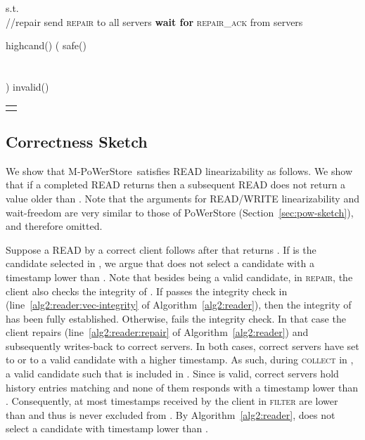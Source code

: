 \documentclass[10pt,conference,compsocconf]{IEEEtran}
\newcommand{\protocol}{PoWerStore}
\newcommand{\mprotocol}{M-PoWerStore}
\begin{document}
\begin{algo}[t]
\begin{distribalgo}[1]
\smallskip
{}
\STATE  s.t. \\ 
\IF {} \label{alg2:reader:vec-integrity}
\STATE  \label{alg2:reader:repair}\hfill //repair
\STATE send \textsc{repair} to all servers
\STATE \textbf{wait for} \textsc{repair\_ack} from  servers
\ENDIF
\ENDINDENT

\smallskip
{}
\STATE \textsf{highcand}()  (
\smallskip
\STATE \textsf{safe}()  \\ \label{alg2:reader:safe}
\\
\\
)
\smallskip
\STATE \textsf{invalid}()  
\ENDINDENT
\setcounter{alg:client1:lines}{\value{ALC@line}}
\end{distribalgo}
\begin{tabular}{c}\hline\mbox{}\hspace{0.45\textwidth}\mbox{}\end{tabular}
\caption{{Algorithm of client  in \mprotocol.}}\label{alg2:reader}
\vspace{-1 em}
\end{algo}


\subsection{Correctness Sketch}
We show that \mprotocol\ satisfies \textsc{READ} linearizability as follows. We show that if a completed \textsc{READ}  returns  then a subsequent \textsc{READ}  does not return a value older than . Note that the arguments for \textsc{READ}/\textsc{WRITE} linearizability and wait-freedom are very similar to those of \protocol{} (Section~\ref{sec:pow-sketch}), and therefore omitted.

Suppose a \textsc{READ}  by a correct client follows after  that returns . If  is the candidate selected in , we argue that  does not select a candidate with a timestamp lower than . Note that besides  being a valid candidate, in \textsc{repair}, the client also checks the integrity of . If  passes the integrity check in  (line~\ref{alg2:reader:vec-integrity} of Algorithm~\ref{alg2:reader}), then the integrity of  has been fully established. Otherwise,  fails the integrity check. In that case the client repairs  (line~\ref{alg2:reader:repair} of Algorithm~\ref{alg2:reader}) and subsequently writes-back  to  correct servers. In both cases,  correct servers have set  to  or to a valid candidate with a higher timestamp. As such, during \textsc{collect} in , a valid candidate  such that  is included in . Since  is valid,  correct servers hold history entries matching  and none of them responds with a timestamp lower than . Consequently, at most  timestamps received by the client in \textsc{filter} are lower than  and thus  is never excluded from . By Algorithm~\ref{alg2:reader},  does not select a candidate with timestamp lower than .
\end{document}
